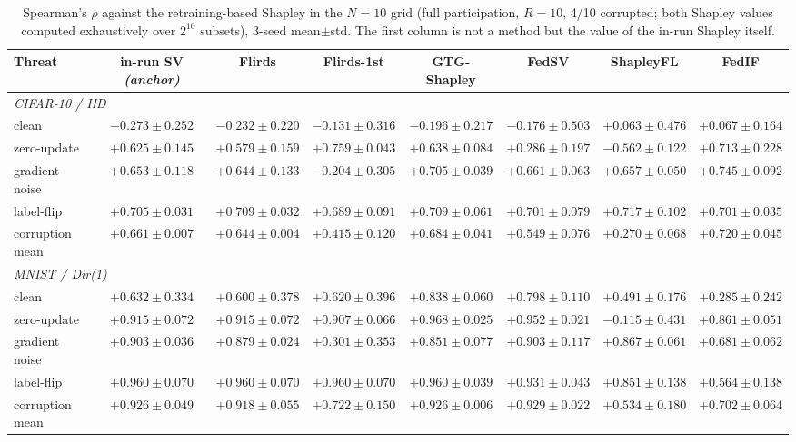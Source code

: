 \documentclass[letterpaper]{article} %
\theoremstyle{plain}
\begin{document}
\begin{table}[t]
\centering
\small
\setlength{\tabcolsep}{2.5pt}
\caption{Spearman's $\rho$ against the retraining-based Shapley in the
$N{=}10$ grid (full participation, $R{=}10$, 4/10 corrupted; both Shapley
values computed exhaustively over $2^{10}$ subsets), 3-seed mean$\pm$std. The
first column is not a method but the value of the in-run Shapley itself.}
\label{tab:grid-retrain}
\begin{tabular}{lccccccc}
\hline
Threat & in-run SV \emph{(anchor)} & Flirds & Flirds-1st & GTG-Shapley & FedSV & ShapleyFL & FedIF \\
\hline
\multicolumn{8}{l}{\emph{CIFAR-10 / IID}} \\
clean & $-0.273\pm0.252$ & $-0.232\pm0.220$ & $-0.131\pm0.316$ & $-0.196\pm0.217$ & $-0.176\pm0.503$ & $+0.063\pm0.476$ & $+0.067\pm0.164$ \\
zero-update & $+0.625\pm0.145$ & $+0.579\pm0.159$ & $+0.759\pm0.043$ & $+0.638\pm0.084$ & $+0.286\pm0.197$ & $-0.562\pm0.122$ & $+0.713\pm0.228$ \\
gradient noise & $+0.653\pm0.118$ & $+0.644\pm0.133$ & $-0.204\pm0.305$ & $+0.705\pm0.039$ & $+0.661\pm0.063$ & $+0.657\pm0.050$ & $+0.745\pm0.092$ \\
label-flip & $+0.705\pm0.031$ & $+0.709\pm0.032$ & $+0.689\pm0.091$ & $+0.709\pm0.061$ & $+0.701\pm0.079$ & $+0.717\pm0.102$ & $+0.701\pm0.035$ \\
corruption mean & $+0.661\pm0.007$ & $+0.644\pm0.004$ & $+0.415\pm0.120$ & $+0.684\pm0.041$ & $+0.549\pm0.076$ & $+0.270\pm0.068$ & $+0.720\pm0.045$ \\
\hline
\multicolumn{8}{l}{\emph{MNIST / Dir(1)}} \\
clean & $+0.632\pm0.334$ & $+0.600\pm0.378$ & $+0.620\pm0.396$ & $+0.838\pm0.060$ & $+0.798\pm0.110$ & $+0.491\pm0.176$ & $+0.285\pm0.242$ \\
zero-update & $+0.915\pm0.072$ & $+0.915\pm0.072$ & $+0.907\pm0.066$ & $+0.968\pm0.025$ & $+0.952\pm0.021$ & $-0.115\pm0.431$ & $+0.861\pm0.051$ \\
gradient noise & $+0.903\pm0.036$ & $+0.879\pm0.024$ & $+0.301\pm0.353$ & $+0.851\pm0.077$ & $+0.903\pm0.117$ & $+0.867\pm0.061$ & $+0.681\pm0.062$ \\
label-flip & $+0.960\pm0.070$ & $+0.960\pm0.070$ & $+0.960\pm0.070$ & $+0.960\pm0.039$ & $+0.931\pm0.043$ & $+0.851\pm0.138$ & $+0.564\pm0.138$ \\
corruption mean & $+0.926\pm0.049$ & $+0.918\pm0.055$ & $+0.722\pm0.150$ & $+0.926\pm0.006$ & $+0.929\pm0.022$ & $+0.534\pm0.180$ & $+0.702\pm0.064$ \\

\end{tabular}
\end{table}
\end{document}
